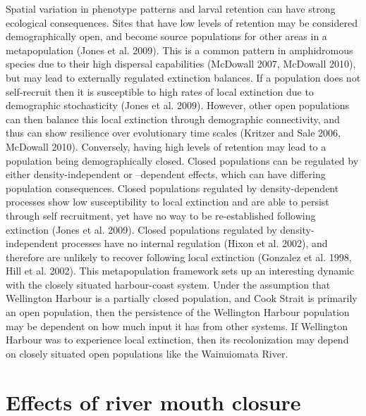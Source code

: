 \documentclass[]{book}
\begin{document}
Spatial variation in phenotype patterns and larval retention can have
strong ecological consequences. Sites that have low levels of retention
may be considered demographically open, and become source populations
for other areas in a metapopulation (Jones et al. 2009). This is a
common pattern in amphidromous species due to their high dispersal
capabilities (McDowall 2007, McDowall 2010), but may lead to externally
regulated extinction balances. If a population does not self-recruit
then it is susceptible to high rates of local extinction due to
demographic stochasticity (Jones et al. 2009). However, other open
populations can then balance this local extinction through demographic
connectivity, and thus can show resilience over evolutionary time scales
(Kritzer and Sale 2006, McDowall 2010). Conversely, having high levels
of retention may lead to a population being demographically closed.
Closed populations can be regulated by either density-independent or
--dependent effects, which can have differing population consequences.
Closed populations regulated by density-dependent processes show low
susceptibility to local extinction and are able to persist through self
recruitment, yet have no way to be re-established following extinction
(Jones et al. 2009). Closed populations regulated by density-independent
processes have no internal regulation (Hixon et al. 2002), and therefore
are unlikely to recover following local extinction (Gonzalez et al.
1998, Hill et al. 2002). This metapopulation framework sets up an
interesting dynamic with the closely situated harbour-coast system.
Under the assumption that Wellington Harbour is a partially closed
population, and Cook Strait is primarily an open population, then the
persistence of the Wellington Harbour population may be dependent on how
much input it has from other systems. If Wellington Harbour was to
experience local extinction, then its recolonization may depend on
closely situated open populations like the Wainuiomata River.

\section{Effects of river mouth
closure}\label{effects-of-river-mouth-closure}
\end{document}
